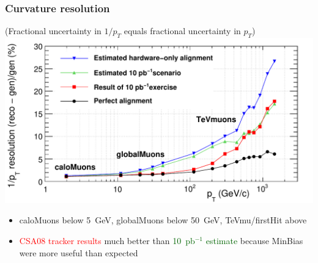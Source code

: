 \documentclass[compress]{beamer}
\begin{document}
\begin{frame}
\frametitle{Curvature resolution}
\small
\vspace{0.2 cm}
(Fractional uncertainty in $1/p_T$ equals fractional uncertainty in $p_T$)
\includegraphics[width=\linewidth]{curvature_resolution.pdf}

\vspace{-0.3 cm}
\begin{itemize}
\item caloMuons below 5~GeV, globalMuons below 50~GeV, TeVmu/firstHit above
\item \textcolor{red}{CSA08 tracker results} much better than \textcolor{darkgreen}{10~pb$^{-1}$ estimate} because MinBias were more useful than expected
\end{itemize}
\end{frame}
\end{document}
